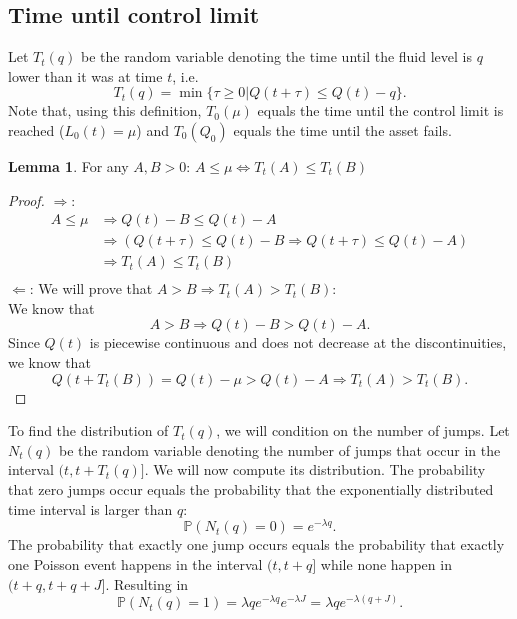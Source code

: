 \documentclass[a4paper]{thesis}
\theoremstyle{definition}
\newtheorem{lemma}{Lemma}[chapter]
\begin{document}
\subsection{Time until control limit}
Let $T_t(q)$ be the random variable denoting the time until the fluid level is $q$ lower than it was at time $t$, i.e.
$$
T_t(q)=\min\{\tau\geq0|Q(t+\tau)\leq Q(t)-q\}.
$$
Note that, using this definition, $T_0(\mu)$ equals the time until the control limit is reached ($L_0(t)=\mu$) and $T_0(Q_0)$ equals the time until the asset fails.
\begin{lemma}\label{lemma:TimeUntilFluidLemma}
	For any $A,B>0$:
	$A\leq\mu\Leftrightarrow T_t(A)\leq T_t(B)$
	\begin{proof}
		$\Rightarrow$: 
		\[\begin{split}
		A\leq\mu&\Rightarrow Q(t)-B\leq Q(t)-A\\
		&\Rightarrow (Q(t+\tau)\leq Q(t)-B\Rightarrow Q(t+\tau)\leq Q(t)-A)\\
		&\Rightarrow T_t(A)\leq T_t(B)\\
		\end{split}\]
		$\Leftarrow$: We will prove that $A>B\Rightarrow T_t(A)> T_t(B)$:\\
		We know that
		$$
		A>B\Rightarrow Q(t)-B > Q(t)-A.
		$$
		Since $Q(t)$ is piecewise continuous and does not decrease at the discontinuities, we know that 
		$$
		Q(t+T_t(B))=Q(t)-\mu>Q(t)-A\Rightarrow T_t(A)> T_t(B).
		$$
	\end{proof}
\end{lemma}
To find the distribution of $T_t(q)$, we will condition on the number of jumps.
Let $N_t(q)$ be the random variable denoting the number of jumps that occur in the interval $(t,t+T_t(q)]$.
We will now compute its distribution.
The probability that zero jumps occur equals the probability that the exponentially distributed time interval is larger than $q$:
$$
\mathbb{P}(N_t(q)=0)=e^{-\lambda q}.
$$
The probability that exactly one jump occurs equals the probability that exactly one Poisson event happens in the interval $(t,t+q]$ while none happen in $(t+q,t+q+J]$. Resulting in
$$
\mathbb{P}(N_t(q)=1)=\lambda q e^{-\lambda q} e^{-\lambda J}=\lambda q e^{-\lambda (q+J)}.
$$
\end{document}
